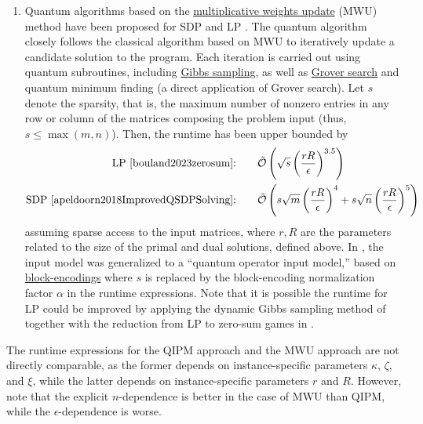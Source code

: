 \begin{refsection}
\begin{enumerate}
    
    \item Quantum algorithms based on the \hyperref[prim:MWU]{multiplicative weights update} (MWU) method have been proposed for SDP \cite{brandao2016QSDPSpeedup,brandao2017QSDPSpeedupsLearning,apeldoorn2017QSDPSolvers,apeldoorn2018ImprovedQSDPSolving} and LP \cite{apeldoorn2017QSDPSolvers,apeldoorn2019QAlgorithmsForZeroSumGames}. The quantum algorithm closely follows the classical algorithm based on MWU to iteratively update a candidate solution to the program. Each iteration is carried out using quantum subroutines, including \hyperref[prim:GibbsSampling]{Gibbs sampling}, as well as \hyperref[prim:AA]{Grover search} and quantum minimum finding \cite{durr1996QMinimumFinding,apeldoorn2017QSDPSolvers} (a direct application of Grover search). Let $s$ denote the sparsity, that is, the maximum number of nonzero entries in any row or column of the matrices composing the problem input (thus, $s \leq \max(m,n)$). Then, the runtime has been upper bounded by
    \begin{equation}
        \begin{split}
            \text{LP \cite{bouland2023zerosum}:}& \qquad \tilde{\mathcal{O}}\left(\sqrt{s}\left(\frac{rR}{\epsilon}\right)^{3.5}\right) \\
            \text{SDP \cite{apeldoorn2018ImprovedQSDPSolving}:}& \qquad \tilde{\mathcal{O}}\left(s\sqrt{m}\left(\frac{rR}{\epsilon}\right)^{4}+s\sqrt{n}\left(\frac{rR}{\epsilon}\right)^5\right)
        \end{split}
\end{equation}
    assuming sparse access to the input matrices, where $r,R$ are the parameters related to the size of the primal and dual solutions, defined above. In  \cite{apeldoorn2018ImprovedQSDPSolving}, the input model was generalized to a ``quantum operator input model,'' based on \hyperref[prim:BlockEncodings]{block-encodings} where $s$ is replaced by the block-encoding normalization factor $\alpha$ in the runtime expressions. Note that it is possible the runtime for LP could be improved by applying the dynamic Gibbs sampling method of  \cite{bouland2023zerosum} together with the reduction from LP to zero-sum games in \cite{apeldoorn2019QAlgorithmsForZeroSumGames}.
\end{enumerate}
The runtime expressions for the QIPM approach and the MWU approach are not directly comparable, as the former depends on instance-specific parameters $\kappa$, $\zeta$, and $\xi$, while the latter depends on instance-specific parameters $r$ and $R$. However, note that the explicit $n$-dependence is better in the case of MWU than QIPM, while the $\epsilon$-dependence is worse. 


\end{refsection}
